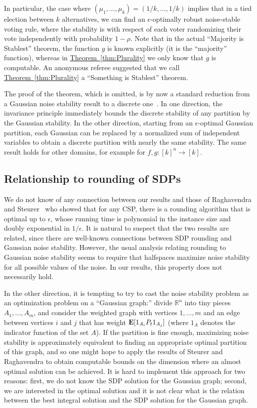 \documentclass[11pt]{article}
\numberwithin{equation}{section}
\theoremstyle{definition}
\theoremstyle{plain}
\newcommand{\R}{\mathbb R}
\newcommand{\expref}[2]{\hyperref[#2]{#1~\ref{#2}}}
\newcommand{\E}{{\bf E}}
\begin{document}
In particular, the case where $(\mu_1,\ldots,\mu_k) = (1/k,\ldots,1/k)$ implies
that in a tied election between $k$ alternatives, we can find an
$\epsilon$-optimally robust
%
noise-stable   %
voting rule, where the stability is
with respect of each voter randomizing their vote independently with
probability $1-\rho$. Note that in the actual ``Majority is Stablest'' theorem,
the function $g$ is known explicitly (it is the ``majority'' function), whereas
in \expref{Theorem}{thm:Plurality} we only know that $g$ is computable. An anonymous
referee suggested that we call \expref{Theorem}{thm:Plurality} a ``Something is Stablest''
theorem.

The proof of the theorem, which is omitted, is by now a standard reduction from a Gaussian noise stability result to a discrete one~\cite{MOO10, IsakssonMossel:12, DMN:sos-journal}. In one direction, the invariance principle immediately bounds the discrete stability of any partition by the Gaussian stability. In the other direction, starting from an $\epsilon$-optimal Gaussian partition, each Gaussian can be replaced by a normalized sum of independent variables to obtain a discrete partition with nearly the same stability.  
The same result holds for other domains, for example for $f,g : [k]^n \to [k]$.

\subsection{Relationship to rounding of SDPs}
We do not know of any connection between our results and those of Raghavendra and Steurer~\cite{RaghavendraSteurer:09} who showed that for any CSP, there is a rounding algorithm that is optimal up to $\epsilon$, whose running time is polynomial in the instance size and doubly exponential in $1/\epsilon$. 
It is natural to suspect that the two results are related, since there are well-known connections between SDP rounding and Gaussian noise stability.
However, the usual analysis relating rounding to Gaussian noise stability seems
to require that halfspaces maximize noise stability for all possible values of
the noise. In our results, this property does not necessarily hold.

In the other direction, it is tempting to try to cast the noise stability
problem as an optimization problem on a ``Gaussian graph:'' divide $\R^n$
into %
%
%
tiny pieces $A_1, \dots, A_m$, and consider the weighted  %
graph with vertices $1, \dots, m$ and an edge between vertices $i$ and $j$
that has weight $\E [1_{A_{i}} P_t 1_{A_j}]$ (where $1_A$ denotes the indicator
function of the set $A$). If the partition is fine enough, maximizing noise
stability is approximately equivalent to finding an appropriate optimal
partition of this graph, and so one might hope to apply the
results of Steurer and Raghavendra to obtain computable bounds on the dimension
where an almost optimal solution can be achieved. It is hard to implement this
approach for two reasons: first, we do not know the SDP solution for the
Gaussian graph; second, we are interested in the optimal solution and it is not
clear what is the relation between the best integral solution and the SDP
solution for the Gaussian graph. 
\end{document}
